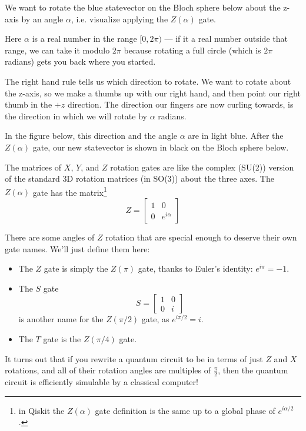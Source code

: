 \documentclass{article}
\theoremstyle{definition}
\begin{document}
\newpage
\begin{example}
We want to rotate the blue statevector on the Bloch sphere below about the z-axis by an angle $\alpha$, i.e. visualize applying the $Z(\alpha)$ gate.

\textnormal{Here $\alpha$ is a real number in the range $[0,2\pi)$ --- if it a real number outside that range, we can take it modulo $2\pi$ because rotating a full circle (which is $2\pi$ radians) gets you back where you started.}

\textnormal{The right hand rule tells us which direction to rotate.  We want to rotate about the z-axis, so we make a thumbs up with our right hand, and then point our right thumb in the $+z$ direction.  The direction our fingers are now curling towards, is the direction in which we will rotate by $\alpha$ radians.}

\textnormal{In the figure below, this direction and the angle $\alpha$ are in light blue.  After the $Z(\alpha)$ gate, our new statevector is shown in black on the Bloch sphere below.}
\begin{figure}[H]
\end{figure}
\end{example}

The matrices of $X$, $Y$, and $Z$ rotation gates are like the complex (SU(2)) version of the standard 3D rotation matrices (in SO(3)) about the three axes.
The $Z(\alpha)$ gate has the matrix\footnote{in Qiskit the $Z(\alpha)$ gate definition is the same up to a global phase of $e^{i\alpha/2}$.}
\begin{equation}
	Z = \begin{bmatrix}
		1 & 0\\
		0 & e^{i\alpha}
	\end{bmatrix}
\end{equation}

There are some angles of $Z$ rotation that are special enough to deserve their own gate names.
We'll just define them here:
\begin{itemize}
	\item The $Z$ gate is simply the $Z(\pi)$ gate, thanks to Euler's identity: $e^{i\pi} = -1$.
	\item The $S$ gate \begin{equation}
		S = \begin{bmatrix}
			1 & 0\\
			0 & i
		\end{bmatrix}
	\end{equation} is another name for the $Z(\pi/2)$ gate, as $e^{i\pi/2} = i$.
	\item The $T$ gate is the $Z(\pi/4)$ gate.
\end{itemize}
It turns out that if you rewrite a quantum circuit to be in terms of just $Z$ and $X$ rotations, and all of their rotation angles are multiples of $\frac{\pi}{2}$, then the quantum circuit is efficiently simulable by a classical computer!
\end{document}
